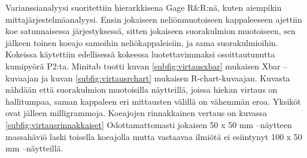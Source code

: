 \documentclass[12pt,a4paper,finnish]{tutthesis}
\begin{document}
Varianssianalyysi suoritettiin hierarkkisena Gage R\&R:nä, kuten aiempikin mittajärjestelmäanalyysi. Ensin jokaiseen neliönmuotoiseen kappaleeseen ajettiin koe satunnaisessa järjestyksessä, sitten jokaiseen suorakulmion muotoiseen, sen jälkeen toinen koeajo samoihin neliökappaleisiin, ja sama suorakulmioihin. Kokeissa käytettiin edellisessä kokeessa luotettavimmaksi osoittautunutta kumipyörä P2:ta. Minitab tuotti
kuvan \ref{subfig:virtausxbar} mukaisen Xbar –kuvaajan ja kuvan \ref{subfig:virtausrchart} mukaisen R-chart-kuvaajan.
Kuvasta nähdään että suorakulmion muotoisilla näytteillä, joissa hiekan virtaus on hallitumpaa, saman kappaleen eri mittausten välillä on vähemmän eroa. Yksiköt ovat jälleen milligrammoja.
Koeajojen rinnakkainen vertaus on kuvassa \ref{subfig:virtausrinnakkaiset}
Odottamattomasti jokaisen 50 x 50 mm –näytteen massahäviö laski toisella koeajolla mutta vastaavaa ilmiötä ei esiintynyt 100 x 50 mm –näytteillä.
\end{document}
